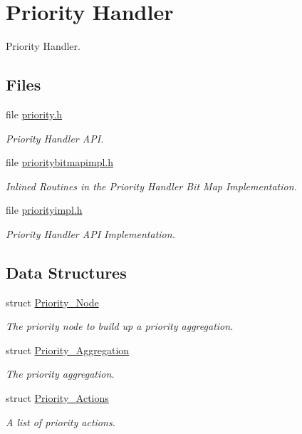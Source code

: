 \hypertarget{group__RTEMSScorePriority}{}\section{Priority Handler}
\label{group__RTEMSScorePriority}


Priority Handler.  


\subsection*{Files}
\begin{DoxyCompactItemize}
\item 
file \mbox{\hyperlink{rtems_2score_2priority_8h}{priority.\+h}}
\begin{DoxyCompactList}\small\item\em Priority Handler A\+PI. \end{DoxyCompactList}\item 
file \mbox{\hyperlink{prioritybitmapimpl_8h}{prioritybitmapimpl.\+h}}
\begin{DoxyCompactList}\small\item\em Inlined Routines in the Priority Handler Bit Map Implementation. \end{DoxyCompactList}\item 
file \mbox{\hyperlink{score_2priorityimpl_8h}{priorityimpl.\+h}}
\begin{DoxyCompactList}\small\item\em Priority Handler A\+PI Implementation. \end{DoxyCompactList}\end{DoxyCompactItemize}
\subsection*{Data Structures}
\begin{DoxyCompactItemize}
\item 
struct \mbox{\hyperlink{structPriority__Node}{Priority\+\_\+\+Node}}
\begin{DoxyCompactList}\small\item\em The priority node to build up a priority aggregation. \end{DoxyCompactList}\item 
struct \mbox{\hyperlink{structPriority__Aggregation}{Priority\+\_\+\+Aggregation}}
\begin{DoxyCompactList}\small\item\em The priority aggregation. \end{DoxyCompactList}\item 
struct \mbox{\hyperlink{structPriority__Actions}{Priority\+\_\+\+Actions}}
\begin{DoxyCompactList}\small\item\em A list of priority actions. \end{DoxyCompactList}\end{DoxyCompactItemize}
